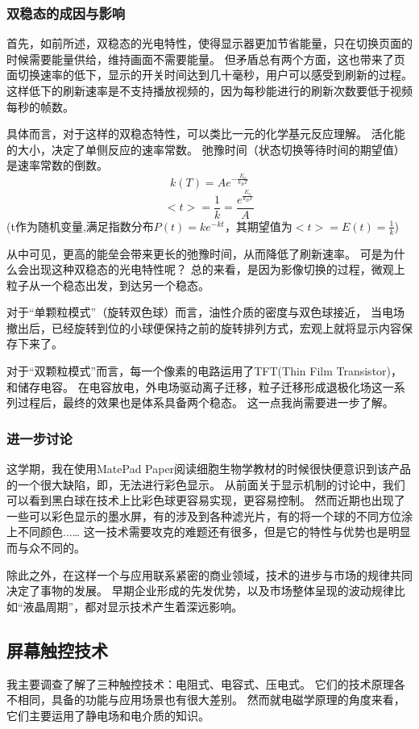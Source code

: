 \documentclass[UTF-8]{ctexart}
\begin{document}
\subsubsection{双稳态的成因与影响}
首先，如前所述，双稳态的光电特性，使得显示器更加节省能量，只在切换页面的时候需要能量供给，维持画面不需要能量。
但矛盾总有两个方面，这也带来了页面切换速率的低下，显示的开关时间达到几十毫秒\cite{tablet}，用户可以感受到刷新的过程。
这样低下的刷新速率是不支持播放视频的，因为每秒能进行的刷新次数要低于视频每秒的帧数。

具体而言，对于这样的双稳态特性，可以类比一元的化学基元反应理解。
活化能的大小，决定了单侧反应的速率常数。
弛豫时间（状态切换等待时间的期望值）是速率常数的倒数。
$$
k(T)=Ae^{-\frac{E_a}{k_BT}}
$$
$$
<t>=\frac{1}{k}=\frac{e^{\frac{E_a}{k_BT}}}{A}
$$
(t作为随机变量,满足指数分布$P(t)=ke^{-kt}$，其期望值为$<t>=E(t)=\frac{1}{k}$)


从中可见，更高的能垒会带来更长的弛豫时间，从而降低了刷新速率。
可是为什么会出现这种双稳态的光电特性呢？
总的来看，是因为影像切换的过程，微观上粒子从一个稳态出发，到达另一个稳态。

对于“单颗粒模式”（旋转双色球）而言，油性介质的密度与双色球接近，
当电场撤出后，已经旋转到位的小球便保持之前的旋转排列方式，宏观上就将显示内容保存下来了\cite{tablet}。

对于“双颗粒模式”而言，每一个像素的电路运用了TFT(Thin Film Transistor)，和储存电容。
在电容放电，外电场驱动离子迁移，粒子迁移形成退极化场这一系列过程后，最终的效果也是体系具备两个稳态。
这一点我尚需要进一步了解。
\subsubsection{进一步讨论}
这学期，我在使用MatePad Paper阅读细胞生物学教材的时候很快便意识到该产品的一个很大缺陷，即，无法进行彩色显示。
从前面关于显示机制的讨论中，我们可以看到黑白球在技术上比彩色球更容易实现，更容易控制。
然而近期也出现了一些可以彩色显示的墨水屏，有的涉及到各种滤光片，有的将一个球的不同方位涂上不同颜色...\dots
这一技术需要攻克的难题还有很多，但是它的特性与优势也是明显而与众不同的。

除此之外，在这样一个与应用联系紧密的商业领域，技术的进步与市场的规律共同决定了事物的发展。
早期企业形成的先发优势，以及市场整体呈现的波动规律比如“液晶周期”，都对显示技术产生着深远影响。
\subsection{屏幕触控技术}
我主要调查了解了三种触控技术：电阻式、电容式、压电式。
它们的技术原理各不相同，具备的功能与应用场景也有很大差别。
然而就电磁学原理的角度来看，它们主要运用了静电场和电介质的知识。
\end{document}
